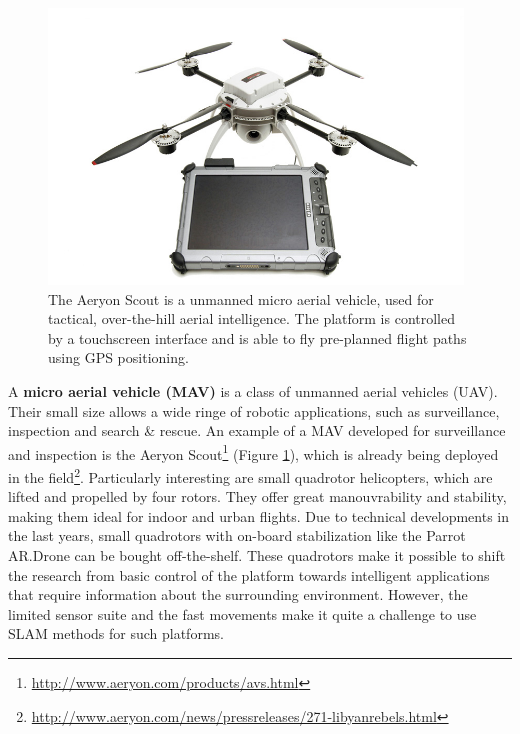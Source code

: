 \begin{figure}[htb]
\centering
\includegraphics[width=11.0cm]{images/aeryon-scout-tablet.jpg}
\caption{The Aeryon Scout is a unmanned micro aerial vehicle, used for tactical, over-the-hill aerial intelligence. The platform is controlled by a touchscreen interface and is able to fly pre-planned flight paths using GPS positioning.}
\label{fig:introduction_aeryon_scout}
\end{figure}

A \textbf{micro aerial vehicle (MAV)} is a class of unmanned aerial vehicles (UAV).
Their small size allows a wide ringe of robotic applications, such as surveillance, inspection and search \& rescue.
An example of a MAV developed for surveillance and inspection is the Aeryon Scout\footnote{\url{http://www.aeryon.com/products/avs.html}} (Figure \ref{fig:introduction_aeryon_scout}), which is already being deployed in the field\footnote{\url{http://www.aeryon.com/news/pressreleases/271-libyanrebels.html}}.
Particularly interesting are small quadrotor helicopters, which are lifted and propelled by four rotors.
They offer great manouvrability and stability, making them ideal for indoor and urban flights.
Due to technical developments in the last years, small quadrotors with on-board stabilization like the Parrot AR.Drone can be bought off-the-shelf.
These quadrotors make it possible to shift the research from basic control of the platform towards intelligent applications that require information about the surrounding environment.
However, the limited sensor suite and the fast movements make it quite a challenge to use SLAM methods for such platforms.



